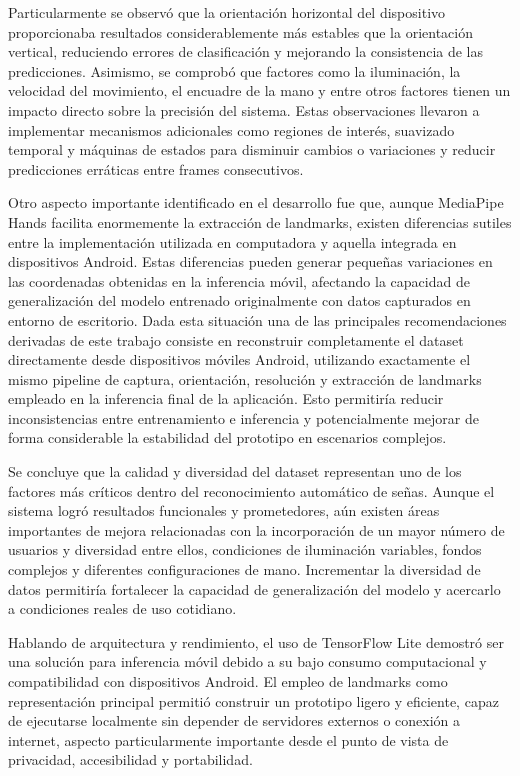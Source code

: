 	Particularmente se observó que la orientación horizontal del dispositivo proporcionaba resultados considerablemente más estables que la orientación vertical, reduciendo errores de clasificación y mejorando la consistencia de las predicciones. Asimismo, se comprobó que factores como la iluminación, la velocidad del movimiento, el encuadre de la mano y entre otros factores tienen un impacto directo sobre la precisión del sistema. Estas observaciones llevaron a implementar mecanismos adicionales como regiones de interés, suavizado temporal y máquinas de estados para disminuir cambios o variaciones y reducir predicciones erráticas entre frames consecutivos.
	
	Otro aspecto importante identificado en el desarrollo fue que, aunque MediaPipe Hands facilita enormemente la extracción de landmarks, existen diferencias sutiles entre la implementación utilizada en computadora y aquella integrada en dispositivos Android. Estas diferencias pueden generar pequeñas variaciones en las coordenadas obtenidas en la inferencia móvil, afectando la capacidad de generalización del modelo entrenado originalmente con datos capturados en entorno de escritorio. Dada esta situación una de las principales recomendaciones derivadas de este trabajo consiste en reconstruir completamente el dataset directamente desde dispositivos móviles Android, utilizando exactamente el mismo pipeline de captura, orientación, resolución y extracción de landmarks empleado en la inferencia final de la aplicación. Esto permitiría reducir inconsistencias entre entrenamiento e inferencia y potencialmente mejorar de forma considerable la estabilidad del prototipo en escenarios complejos.
	
	Se concluye que la calidad y diversidad del dataset representan uno de los factores más críticos dentro del reconocimiento automático de señas. Aunque el sistema logró resultados funcionales y prometedores, aún existen áreas importantes de mejora relacionadas con la incorporación de un mayor número de usuarios y diversidad entre ellos, condiciones de iluminación variables, fondos complejos y diferentes configuraciones de mano. Incrementar la diversidad de datos permitiría fortalecer la capacidad de generalización del modelo y acercarlo a condiciones reales de uso cotidiano.
	
	Hablando de arquitectura y rendimiento, el uso de TensorFlow Lite demostró ser una solución para inferencia móvil debido a su bajo consumo computacional y compatibilidad con dispositivos Android. El empleo de landmarks como representación principal permitió construir un prototipo ligero y eficiente, capaz de ejecutarse localmente sin depender de servidores externos o conexión a internet, aspecto particularmente importante desde el punto de vista de privacidad, accesibilidad y portabilidad.
	
